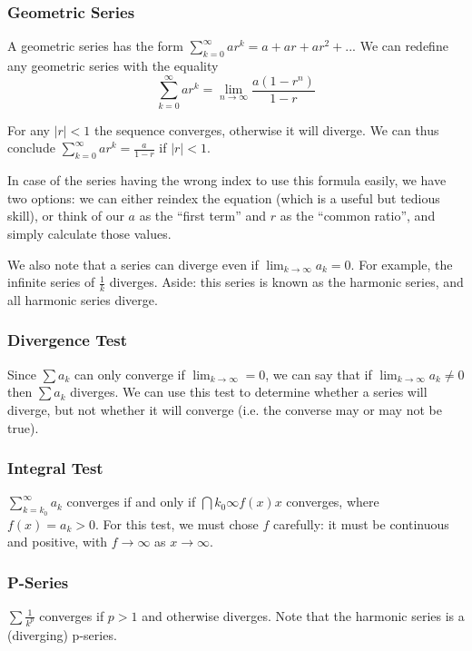 \documentclass[12pt]{article}
\begin{document}
\subsubsection*{Geometric Series}
A geometric series has the form $\displaystyle\sum_{k=0}^\infty ar^k = a + ar + ar^2 + ...$ We can redefine any geometric series with the equality  \[ \sum_{k=0}^\infty ar^k = \lim_{n\to\infty} \frac{a(1-r^n)}{1-r} \]

For any $|r| < 1$ the sequence converges, otherwise it will diverge. We can thus conclude $\displaystyle\sum_{k=0}^\infty ar^k = \frac{a}{1-r}$ if $|r| < 1$.

In case of the series having the wrong index to use this formula easily, we have two options: we can either reindex the equation (which is a useful but tedious skill), or think of our $a$ as the ``first term'' and $r$ as the ``common ratio'', and simply calculate those values.

We also note that a series can diverge even if $\displaystyle\lim_{k\to\infty} a_k = 0$. For example, the infinite series of $\frac{1}{k}$ diverges. Aside: this series is known as the harmonic series, and all harmonic series diverge.

\subsubsection*{Divergence Test}
Since $\sum a_k$ can only converge if $\displaystyle\lim_{k\to\infty} = 0$, we can say that if $\displaystyle\lim_{k\to\infty} a_k \neq 0$ then $\sum a_k$ diverges. We can use this test to determine whether a series will diverge, but not whether it will converge (i.e. the converse may or may not be true).

\subsubsection*{Integral Test}
$\displaystyle\sum_{k=k_0}^\infty a_k$ converges if and only if $\dint{k_0}{\infty}{f(x)}{x}$ converges, where $f(x) = a_k > 0$. For this test, we must chose $f$ carefully: it must be continuous and positive, with $f \to \infty$ as $x \to \infty$.

\subsubsection*{P-Series}
$\sum \frac{1}{k^p}$ converges if $p > 1$ and otherwise diverges. Note that the harmonic series is a (diverging) p-series.
\end{document}
